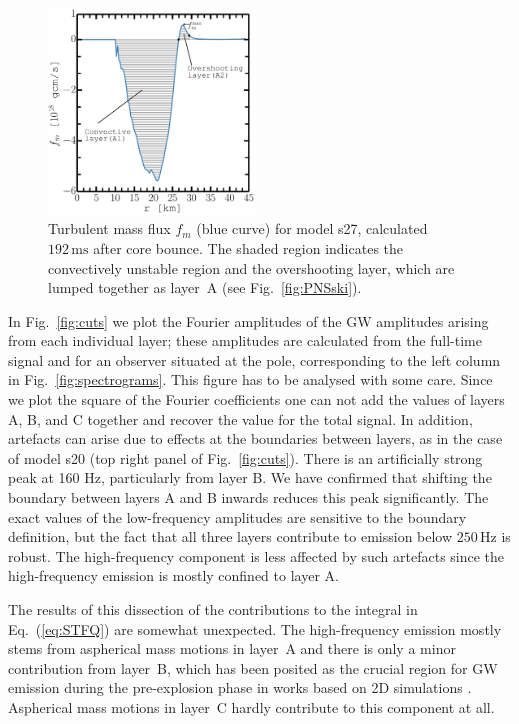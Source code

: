 \begin{figure}                                       
\includegraphics[width=0.49\textwidth]{./images/chp1/fig5.pdf}
\caption{Turbulent mass flux $f_m$ (blue curve) for model s27, calculated $192 \, \mathrm{ms}$ after core bounce.
The shaded region indicates the convectively unstable region and the overshooting layer, which
are lumped together as layer~A  (see Fig.~\ref{fig:PNSski}).
\label{fig:fm}}
\end{figure}

In Fig.~\ref{fig:cuts} we plot the Fourier amplitudes of the GW
amplitudes arising from each individual layer; these amplitudes are
calculated from the full-time signal and for an observer situated at
the pole, corresponding to the left column in
Fig.~\ref{fig:spectrograms}. This figure has to be analysed with some care. Since
we plot the square of the Fourier coefficients one can not add the values of layers A, B, and C 
together and recover the value for the total signal. In addition, artefacts can arise due to
effects at the boundaries between layers, as in the case of model s20 (top right panel of Fig.~\ref{fig:cuts}).
There is an artificially strong peak at 160 Hz, particularly from layer B. We have confirmed that shifting the 
boundary between layers A and B inwards reduces this peak significantly. The exact values of the low-frequency
amplitudes are sensitive to the boundary definition, but the fact that all three layers contribute to
emission below $250 \, \mathrm{Hz}$ is robust. The high-frequency component is less affected by such artefacts since the high-frequency emission is mostly confined to layer A.  

The results of this dissection of the
contributions to the integral in Eq.~(\ref{eq:STFQ}) are somewhat
unexpected.
The high-frequency emission  mostly stems from aspherical
mass motions in layer~A and there is only a
minor contribution from layer~B, which has been posited as
the crucial region for GW emission during the pre-explosion phase in
works based on 2D simulations \citep{marek_08,murphy_09,mueller_13}.
Aspherical mass motions in layer~C hardly contribute
to this component at all.


